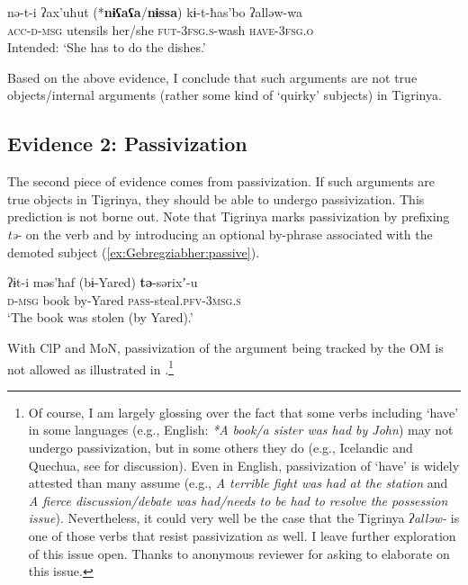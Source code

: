 \documentclass[output=paper]{langscibook}
\begin{document}
\ea\label{ex:Gebregziabher:obl-acc}
\gll nə-t-i ʔax'uħut (*{\textbf{nɨʕaʕa}}/{\textbf{nɨssa}}) kɨ-t-ħas'bo ʔalləw-wa\\
{\scshape acc-d-msg} utensils her/she  {\scshape fut-3fsg.s-}wash {\scshape have-3fsg.o}\\
\glt Intended: `She has to do the dishes.'
\z

\noindent Based on the above evidence, I conclude that such arguments are not true objects/internal arguments (rather some kind of `quirky' subjects) in Tigrinya.


\subsection{Evidence 2: Passivization}\label{sec:SOR}

The second piece of evidence comes from passivization. If such arguments are true objects in Tigrinya, they should be able to undergo passivization. This prediction is not borne out.
Note that Tigrinya marks passivization by prefixing {\emph{tə-}} on the verb and by introducing an optional by-phrase associated with the demoted subject (\ref{ex:Gebregziabher:passive}). 


\ea\label{ex:Gebregziabher:passive} 
\gll ʔɨt-i məs'ħaf (bɨ-Yared) {\textbf{tə}}-sərixʼ-u\\
{\scshape d-msg} book by-Yared {\scshape pass}-steal.{\scshape pfv-3msg.s}\\
\glt `The book was stolen (by Yared).'
\z


\noindent With ClP and MoN, passivization of the argument being tracked by the OM is not allowed as illustrated in .\footnote{Of course, I am largely glossing over the fact that some verbs including `have' in some languages (e.g., English: \emph{*A book/a sister was had by John}) may not undergo passivization, but in some others they do (e.g., Icelandic and Quechua, see \citealt{myler16} for discussion). Even in English, passivization of `have' is widely attested than many assume (e.g., \emph{A terrible fight was had at the station} and \emph{A fierce discussion/debate was had/needs to be had to resolve the possession issue}). Nevertheless, it could very well be the case that the Tigrinya \emph{ʔalləw-} is one of those verbs that resist passivization as well. I leave further exploration of this issue open. Thanks to anonymous reviewer for asking to elaborate on this issue.}


\ea\label{ex:Gebregziabher:passive1}
\z
\z
\end{document}
